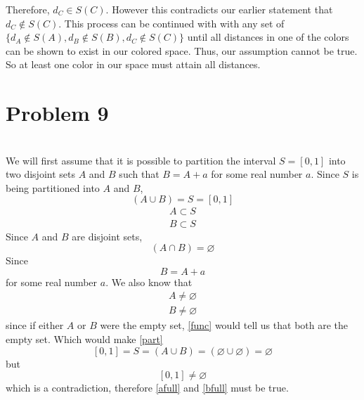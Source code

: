 \documentclass[12pt]{article}
\begin{document}
\begin{center}
\end{center}

 Therefore, $d_C \in S(C)$. However this contradicts our earlier statement that $d_C \notin S(C)$. This process can be continued with with any set of $\{d_A \notin S(A), d_B \notin S(B), d_C \notin S(C)\}$ until all distances in one of the colors can be shown to exist in our colored space. Thus, our assumption cannot be true. So at least one color in our space must attain all distances.


\newpage
\section*{Problem 9}
\\

We will first assume that it is possible to partition the interval $S = [0, 1]$ into two disjoint sets $A$ and $B$ such that $B = A + a$ for some real number $a$. Since $S$ is being partitioned into $A$ and $B$,
\begin{equation} \label{part}
    (A \cup B) = S = [0,1]
\end{equation}
\begin{align}
    A \subset S \label{asub} \\
    B \subset S \label{bsub}
\end{align}
Since $A$ and $B$ are disjoint sets,
\begin{equation} \label{disj}
    (A \cap B) = \varnothing
\end{equation}
Since
\begin{equation} \label{func}
    B = A + a
\end{equation} for some real number $a$. We also know that
\begin{align}
    A \ne \varnothing \label{afull} \\
    B \ne \varnothing \label{bfull}
\end{align}
since if either $A$ or $B$ were the empty set, \eqref{func} would tell us that both are the empty set. Which would make \eqref{part}
\[[0,1] = S = (A \cup B) = (\varnothing \cup \varnothing) = \varnothing\]
but
\[[0,1] \ne \varnothing\]
which is a contradiction, therefore \eqref{afull} and \eqref{bfull} must be true.
\end{document}
